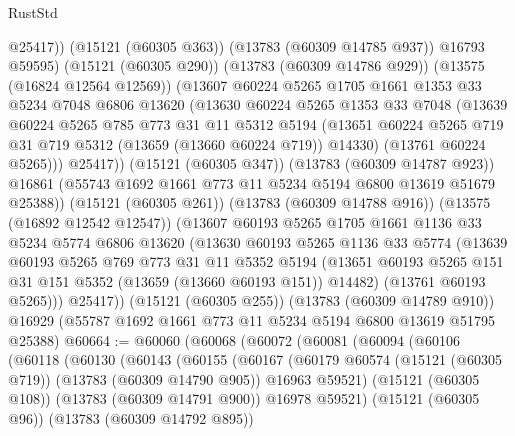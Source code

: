 \begin{lexlean}{RustStd}
\begin{coremodule}
                @25417))
            (@15121 (@60305 @363))
            (@13783 (@60309 @14785 @937))
            @16793
            @59595)
          (@15121 (@60305 @290))
          (@13783 (@60309 @14786 @929))
          (@13575 (@16824 @12564 @12569))
          (@13607
            @60224
            @5265
            @1705
            @1661
            @1353
            @33
            @5234
            @7048
            @6806
            @13620
            (@13630
              @60224
              @5265
              @1353
              @33
              @7048
              (@13639
                @60224
                @5265
                @785
                @773
                @31
                @11
                @5312
                @5194
                (@13651 @60224 @5265 @719 @31 @719 @5312 (@13659 (@13660 @60224 @719)) @14330)
                (@13761 @60224 @5265)))
            @25417))
        (@15121 (@60305 @347))
        (@13783 (@60309 @14787 @923))
        @16861
        (@55743 @1692 @1661 @773 @11 @5234 @5194 @6800 @13619 @51679 @25388))
      (@15121 (@60305 @261))
      (@13783 (@60309 @14788 @916))
      (@13575 (@16892 @12542 @12547))
      (@13607
        @60193
        @5265
        @1705
        @1661
        @1136
        @33
        @5234
        @5774
        @6806
        @13620
        (@13630
          @60193
          @5265
          @1136
          @33
          @5774
          (@13639
            @60193
            @5265
            @769
            @773
            @31
            @11
            @5352
            @5194
            (@13651 @60193 @5265 @151 @31 @151 @5352 (@13659 (@13660 @60193 @151)) @14482)
            (@13761 @60193 @5265)))
        @25417))
    (@15121 (@60305 @255))
    (@13783 (@60309 @14789 @910))
    @16929
    (@55787 @1692 @1661 @773 @11 @5234 @5194 @6800 @13619 @51795 @25388)
@60664 := @60060
    (@60068
      (@60072
        (@60081
          (@60094
            (@60106
              (@60118
                (@60130
                  (@60143
                    (@60155
                      (@60167
                        (@60179
                          @60574
                          (@15121 (@60305 @719))
                          (@13783 (@60309 @14790 @905))
                          @16963
                          @59521)
                        (@15121 (@60305 @108))
                        (@13783 (@60309 @14791 @900))
                        @16978
                        @59521)
                      (@15121 (@60305 @96))
                      (@13783 (@60309 @14792 @895))

\end{coremodule}
\end{lexlean}
